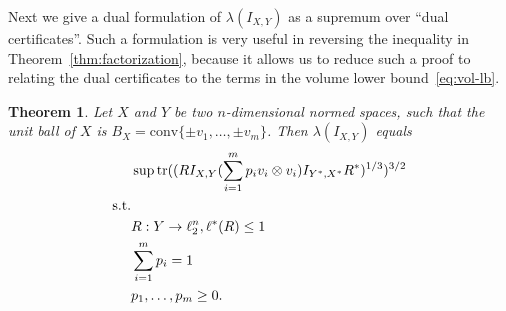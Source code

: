 \documentclass{article}
\newtheorem{theorem}{Theorem}
\DeclareMathOperator{\tr}{tr}
\begin{document}
Next we give a dual formulation of $\lambda(I_{X,Y})$ as a
supremum over ``dual certificates''. Such a formulation is very useful
in reversing the inequality in Theorem~\ref{thm:factorization},
because it allows us to reduce such a proof to relating the dual
certificates to the terms in the volume lower bound~\eqref{eq:vol-lb}.

\begin{theorem}\label{thm:dual}
  Let $X$ and $Y$ be two $n$-dimensional normed
  spaces, such that the unit ball of $X$ is $B_X = \mathrm{conv}\{\pm
  v_1, \ldots, \pm v_m\}$. Then $\lambda(I_{X,Y})$ equals
  \begin{align}
    &\sup \tr((RI_{X,Y}(\sum_{i = 1}^m{p_i v_i \otimes  v_i})I_{Y^*,X^*}R^*)^{1/3})^{3/2}\label{eq:dual-obj}\\
    \text{s.t.}\notag\\
    &R: Y \to \ell_2^n, \ell^*(R) \le 1 \label{eq:dual-ellstar}\\
    &\sum_{i = 1}^m{p_i} = 1\label{eq:dual-prob}\\
    &p_1, \ldots, p_m \ge 0. \label{eq:dual-nonneg}
  \end{align}
\end{theorem}
\end{document}
